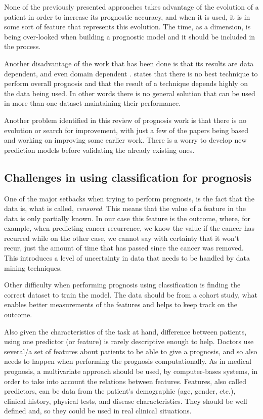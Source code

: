 None of the previously presented approaches takes advantage of the evolution of a patient in order to increase its prognostic
 accuracy, and when it is used, it is in some sort of feature that represents this evolution. The time, as a dimension, is being 
 over-looked when building a prognostic model and it should be included in the process.

Another disadvantage of the work that has been done is that its results are data dependent, and even domain dependent \cite{Endo2008}.
 states that there is no best technique to perform overall prognosis and that the result of a technique depends highly on the data 
 being used. In other words there is no general solution that can be used in more than one dataset maintaining their performance.

Another problem identified in this review of prognosis work is that there is no evolution or search for improvement, with
 just a few of the papers being based and working on improving some earlier work. There is a worry to develop new prediction 
 models before validating the already existing ones.
 
 \subsection{Challenges in using classification for prognosis}
 \label{subsection:difficulties}
 
One of the major setbacks when trying to perform prognosis, is the fact that the data is, what is called, \emph{censored}. This means that 
the value of a feature in the data is only partially known. In our case this feature is the outcome, where, for example, when 
predicting cancer recurrence, we know the value if the cancer has recurred while on the other case, we cannot say with certainty 
that it won’t recur, just the amount of time that has passed since the cancer was removed. This introduces a level of uncertainty in data that needs to be handled by data mining techniques.

Other difficulty when performing prognosis using classification is finding the correct dataset to train the model. The data
 should be from a cohort study, what enables better measurements of the features and helps to keep track on the outcome.

Also given the characteristics of the task at hand, difference between patients, using one predictor (or feature) is rarely 
descriptive enough to help. Doctors use several/a set of features about patients to be able to give a prognosis, and so 
also needs to happen when performing the prognosis computationally. As in medical prognosis, a multivariate approach should
 be used, by computer-bases systems, in order to take into account the relations between features. Features, also called
  predictors, can be data from the patient’s demographic (age, gender, etc.), clinical history, physical tests, and
   disease characteristics. They should be well defined and, so they could be used in real clinical situations.



 
\cleardoublepage